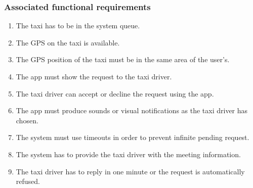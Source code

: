 \subsubsection{Associated functional requirements}
\begin{enumerate}
\item The taxi has to be in the system queue.
\item The GPS on the taxi is available.
\item The GPS position of the taxi must be in the same area of the user's.
\item The app must show the request to the taxi driver.
\item The taxi driver can accept or decline the request using the app.
\item The app must produce sounds or visual notifications as the taxi driver has chosen.
\item The system must use timeouts in order to prevent infinite pending request.
\item The system has to provide the taxi driver with the meeting information.
\item The taxi driver has to reply in one minute or the request is automatically refused.
\end{enumerate}